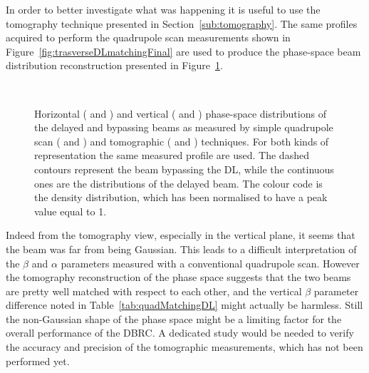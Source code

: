 In order to better investigate what was happening it is useful to use the tomography technique
presented in Section~\ref{sub:tomography}.
The same profiles acquired to perform the quadrupole scan measurements shown in
Figure~\ref{fig:trasverseDLmatchingFinal} are used to produce 
the phase-space beam distribution reconstruction presented in Figure~\ref{fig:trasverseDLtomography}.
%
\begin{figure}[htbp]
\centering
{}
\qquad
{}
\\
\qquad
{}
\caption{Horizontal (\protect{} and
         \protect{}) and vertical
         (\protect{} and
         \protect{}) 
         phase-space distributions of the delayed and bypassing beams as measured by simple quadrupole
         scan (\protect{} and
         \protect{}) and tomographic
         (\protect{} and
         \protect{}) techniques.
         For both kinds of representation the same measured profile are used.
         The dashed contours represent the beam bypassing the DL, while the continuous ones are the
         distributions of the delayed beam.
         The colour code is the density distribution, which has been normalised to have a peak value
         equal to 1.
}
\label{fig:trasverseDLtomography}
\end{figure}
%
Indeed from the tomography view, especially in the vertical plane, it seems that the beam was far from
being Gaussian.
This leads to a difficult interpretation of the $\beta$ and $\alpha$ parameters measured with a
conventional quadrupole scan.
However the tomography reconstruction of the phase space suggests that the two beams are pretty well
matched with respect to each other, and the vertical $\beta$ parameter difference noted in
Table~\ref{tab:quadMatchingDL} might actually be harmless.
Still the non-Gaussian shape of the phase space might be a limiting factor for the overall performance
of the DBRC. 
A dedicated study would be needed to verify the accuracy and precision of the tomographic
measurements, which has not been performed yet.


